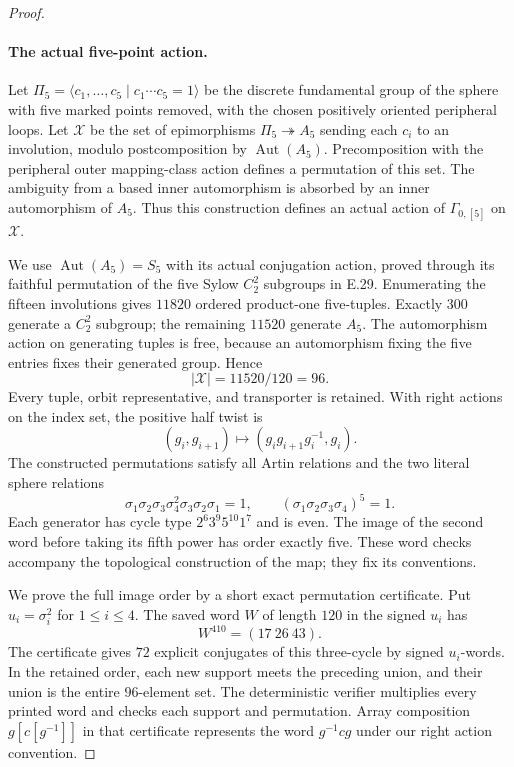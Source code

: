 \begin{proof}
\paragraph{The actual five-point action.}
Let $\Pi_5=\langle c_1,\ldots,c_5\mid c_1\cdots c_5=1\rangle$
be the discrete fundamental group of the sphere with five marked
points removed, with the chosen positively oriented peripheral
loops.  Let $\mathcal X$ be the set of epimorphisms
$\Pi_5\twoheadrightarrow A_5$ sending each $c_i$ to an involution,
modulo postcomposition by $\operatorname{Aut}(A_5)$.
Precomposition with the peripheral outer mapping-class action
defines a permutation of this set.  The ambiguity from a based
inner automorphism is absorbed by an inner automorphism of $A_5$.
Thus this construction defines an actual action of
$\Gamma_{0,[5]}$ on $\mathcal X$.

We use $\operatorname{Aut}(A_5)=S_5$ with its actual conjugation
action, proved through its faithful permutation of the five
Sylow $C_2^2$ subgroups in E.29.  Enumerating the fifteen
involutions gives $11820$ ordered product-one five-tuples.
Exactly $300$ generate a $C_2^2$ subgroup; the remaining $11520$
generate $A_5$.  The automorphism action on generating tuples
is free, because an automorphism fixing the five entries fixes
their generated group.  Hence
\[
                         |\mathcal X|=11520/120=96.
 \tag{E.46.6}
\]
Every tuple, orbit representative, and transporter is retained.
With right actions on the index set, the positive half twist is
\[
 (g_i,g_{i+1})\longmapsto
              (g_ig_{i+1}g_i^{-1},g_i).
 \tag{E.46.7}
\]
The constructed permutations satisfy all Artin relations and
the two literal sphere relations
\[
 \sigma_1\sigma_2\sigma_3\sigma_4^2\sigma_3\sigma_2\sigma_1=1,
       \qquad (\sigma_1\sigma_2\sigma_3\sigma_4)^5=1.
 \tag{E.46.8}
\]
Each generator has cycle type $2^6 3^9 5^{10}1^7$ and is even.
The image of the second word before taking its fifth power
has order exactly five.  These word checks accompany the
topological construction of the map; they fix its conventions.

We prove the full image order by a short exact permutation
certificate.  Put $u_i=\sigma_i^2$ for $1\le i\le4$.
The saved word $W$ of length $120$ in the signed $u_i$ has
\[
                          W^{410}=(17\ 26\ 43).
 \tag{E.46.9}
\]
The certificate gives $72$ explicit conjugates of this
three-cycle by signed $u_i$-words.  In the retained order,
each new support meets the preceding union, and their union
is the entire $96$-element set.  The deterministic verifier
multiplies every printed word and checks each support and
permutation.  Array composition $g[c[g^{-1}]]$ in that
certificate represents the word $g^{-1}cg$ under our right
action convention.


\end{proof}
